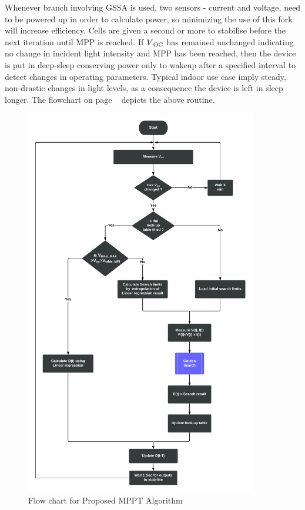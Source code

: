 Whenever branch involving \ac{GSSA} is used, two sensors - current and voltage, need to be powered up in order to calculate power, so minimizing the use of this fork will increase efficiency. Cells are given a second or more to stabilise before the next iteration until \ac{MPP} is reached. If $V\textsubscript{OC}$ has remained unchanged indicating no change in incident light intensity and \ac{MPP} has been reached, then the device is put in deep-sleep conserving power only to wakeup after a specified interval to detect changes in operating parameters. Typical indoor use case imply steady, non-drastic changes in light levels, as a consequence the device is left in sleep longer. The flowchart on page ~\pageref{fig:cyflow} depicts the above routine.\\
                    
           
  \begin{figure}[H]
    \begin{center}
	   \includegraphics[width=0.9\textwidth]{images/Proposed_Flow}
	   \caption{ Flow chart for Proposed MPPT Algorithm }
	   \label{fig:cyflow}
    \end{center}
  \end{figure}





